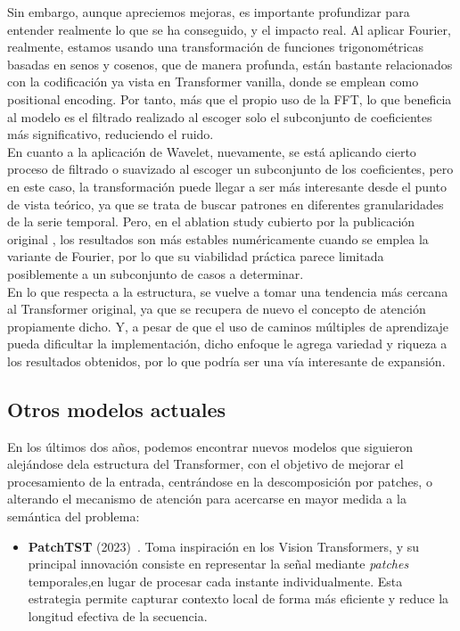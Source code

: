 {Sin embargo, aunque apreciemos mejoras, es importante profundizar para entender realmente lo que se ha conseguido, y el impacto real. Al aplicar Fourier, realmente, estamos usando una transformación de funciones trigonométricas basadas en senos y cosenos, que de manera profunda, están bastante relacionados con la codificación ya vista en Transformer vanilla, donde se emplean como positional encoding. Por tanto, más que el propio uso de la FFT, lo que beneficia al modelo es el filtrado realizado al escoger solo el subconjunto de coeficientes más significativo, reduciendo el ruido.\\

En cuanto a la aplicación de Wavelet, nuevamente, se está aplicando cierto proceso de filtrado o suavizado al escoger un subconjunto de los coeficientes, pero en este caso, la transformación puede llegar a ser más interesante desde el punto de vista teórico, ya que se trata de buscar patrones en diferentes granularidades de la serie temporal. Pero, en el ablation study cubierto por la publicación original \cite{zhou2022fedformerfrequencyenhanceddecomposed}, los resultados son más estables numéricamente cuando se emplea la variante de Fourier, por lo que su viabilidad práctica parece limitada posiblemente a un subconjunto de casos a determinar.\\

En lo que respecta a la estructura, se vuelve a tomar una tendencia más cercana al Transformer original, ya que se recupera de nuevo el concepto de atención propiamente dicho. Y, a pesar de que el uso de caminos múltiples de aprendizaje pueda dificultar la implementación, dicho enfoque le agrega variedad y riqueza a los resultados obtenidos, por lo que podría ser una vía interesante de expansión.

\subsection{Otros modelos actuales}

En los últimos dos años, podemos encontrar nuevos modelos que siguieron alejándose dela estructura del Transformer, con el objetivo de mejorar el procesamiento de la entrada, centrándose en la descomposición por patches, o alterando el mecanismo de atención para acercarse en mayor medida a la semántica del problema:

\begin{itemize}
    \item \textbf{PatchTST} (2023)~\cite{nie2023timeseriesworth64}. Toma inspiración en los Vision Transformers, y su principal innovación consiste en representar la señal mediante \textit{patches} temporales,en lugar de procesar cada instante individualmente. Esta estrategia permite capturar contexto local de forma más eficiente y reduce la longitud efectiva de la secuencia.


\end{itemize}}
